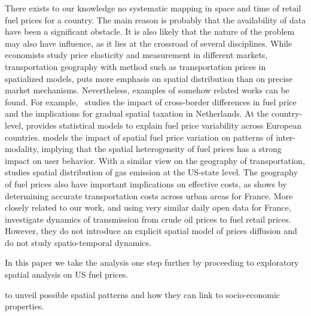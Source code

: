 \documentclass[3p,times,procedia]{elsarticle}
\begin{document}
There exists to our knowledge no systematic mapping in space and time of retail fuel prices for a country. The main reason is probably that the availability of data have been a significant obstacle. It is also likely that the nature of the problem may also have influence, as it lies at the crossroad of several disciplines. While economists study price elasticity and measurement in different markets, transportation geography with method such as transportation prices in spatialized models, puts more emphasis on spatial distribution than on precise market mechanisms. Nevertheless, examples of somehow related works can be found. For example,~\cite{rietveld2001spatial} studies the impact of cross-border differences in fuel price and the implications for gradual spatial taxation in  Netherlands. At the country-level, \cite{rietveld2005fuel} provides statistical models to explain fuel price variability across European countries. \cite{macharis2010decision} models the impact of spatial fuel price variation on patterns of inter-modality, implying that the spatial heterogeneity of fuel prices has a strong impact on user behavior. With a similar view on the geography of transportation, \cite{gregg2009temporal} studies spatial distribution of gas emission at the US-state level. The geography of fuel prices also have important implications on effective costs, as shows \cite{combes2005transport} by determining accurate transportation costs across urban areas for France. More closely related to our work, and using very similar daily open data for France, \cite{gautier2015dynamics} investigate dynamics of transmission from crude oil prices to fuel retail prices. However, they do not introduce an explicit spatial model of prices diffusion and do not study spatio-temporal dynamics. 

In this paper we take the analysis one step further by proceeding to exploratory spatial analysis on US fuel prices. 

to unveil possible spatial patterns and how they can link to socio-economic properties.



\end{document}
